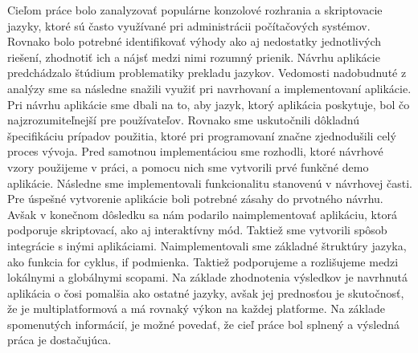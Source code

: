 \indent Cieľom práce bolo zanalyzovať populárne konzolové rozhrania a skriptovacie jazyky, ktoré sú často využívané pri administrácii počítačových systémov. Rovnako bolo potrebné identifikovať výhody ako aj nedostatky jednotlivých riešení, zhodnotiť ich a nájsť medzi nimi rozumný prienik. 
\newline
\indent Návrhu aplikácie predchádzalo štúdium problematiky prekladu jazykov. Vedomosti nadobudnuté z analýzy sme sa následne snažili využiť pri navrhovaní a implementovaní aplikácie. 
\newline
\indent Pri návrhu aplikácie sme dbali na to, aby jazyk, ktorý aplikácia poskytuje, bol čo najzrozumiteľnejší pre používateľov. Rovnako sme uskutočnili dôkladnú špecifikáciu prípadov použitia, ktoré pri programovaní značne zjednodušili celý proces vývoja. Pred samotnou implementáciou sme rozhodli, ktoré návrhové vzory použijeme v práci, a pomocu nich sme vytvorili prvé funkčné demo aplikácie. 
\newline
\indent Následne sme implementovali funkcionalitu stanovenú v návrhovej časti. Pre úspešné vytvorenie aplikácie boli potrebné zásahy do prvotného návrhu. Avšak v konečnom dôsledku sa nám podarilo naimplementovať aplikáciu, ktorá podporuje skriptovací, ako aj interaktívny mód. Taktiež sme vytvorili spôsob integrácie s inými aplikáciami. Naimplementovali sme základné štruktúry jazyka, ako funkcia for cyklus, if podmienka. Taktiež podporujeme a rozlišujeme medzi lokálnymi a globálnymi scopami. Na základe zhodnotenia výsledkov je navrhnutá aplikácia o čosi pomalšia ako ostatné jazyky, avšak jej prednosťou je skutočnosť, že je multiplatformová a má rovnaký výkon na každej platforme.
\newline
\indent Na základe spomenutých informácií, je možné povedať, že cieľ práce bol splnený a výsledná práca je dostačujúca.